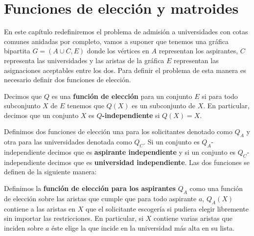 \chapter{Funciones de elección y matroides}

En este capítulo redefiniremos el problema de admisión a universidades con cotas comunes anidadas por completo, vamos a suponer que tenemos una gráfica bipartita $G=(A\cup C,E)$ donde los vértices en $A$ representan los aspirantes, $C$ representa las universidades y las aristas de la gráfica $E$ representan las asignaciones aceptables entre los dos. Para definir el problema de esta manera es necesario definir dos funciones de elección. 

\begin{dfn}
Decimos que $Q$ es una \textbf{función de elección} para un conjunto $E$ si para todo subconjunto $X$ de $E$ tenemos que $Q(X)$ es un subconjunto de $X$. En particular, decimos que un conjunto $X$ es \textbf{$Q$-independiente} si $Q(X)=X$.
\end{dfn}

Definimos dos funciones de elección una para los solicitantes denotado como $Q_A$ y otra para las universidades denotada como $Q_C$. Si un conjunto es $Q_A$-independiente decimos que es \textbf{aspirante independiente} y si un conjunto es $Q_C$-independiente decimos que es \textbf{universidad independiente}. Las dos funciones se definen de la siguiente manera:

\begin{dfn}
Definimos la \textbf{función de elección para los aspirantes} $Q_A$ como una función de elección sobre las aristas que cumple que para todo aspirante $a$, $Q_A(X)$ contiene a las aristas en $X$ que el solicitante escogería si pudiera elegir libremente sin importar las restricciones. En particular, si $X$ contiene varias aristas que inciden sobre $a$ éste elige la que incide en la universidad más alta en su lista. 
\end{dfn} 

